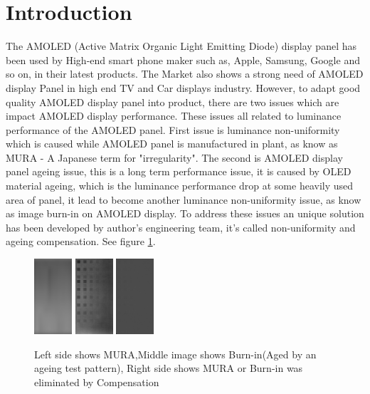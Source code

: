 \documentclass{article}
\begin{document}
\section{Introduction}
The AMOLED (Active Matrix Organic Light Emitting Diode) display panel has been used by High-end smart phone maker such as, Apple, Samsung, Google and so on, in their latest products. The Market also shows a strong need of AMOLED display Panel in high end TV and Car displays industry. However, to adapt good quality AMOLED display panel into product, there are two issues which are impact AMOLED display performance. These issues all related to luminance performance of the AMOLED panel. First issue is luminance non-uniformity which is caused while AMOLED panel is manufactured in plant, as know as MURA - A Japanese term for "irregularity". The second is AMOLED display panel ageing issue, this is a long term performance issue, it is caused by OLED material ageing, which is the luminance performance drop at some heavily used area of panel, it lead to become another luminance non-uniformity issue, as know as image burn-in on AMOLED display. 
To address these issues an unique solution has been developed by author's engineering team, it's called non-uniformity and ageing compensation. See figure \ref{fig1}. \\
\begin{figure}[h]
    \centering
    \includegraphics[width=0.125\textwidth]{images/csfed_G_480_I0_PsdLum.png}\hfill    
    \includegraphics[width=0.125\textwidth]{images/A1_G_300_I0_PsdLum.csv.png}\hfill
    \includegraphics[width=0.125\textwidth]{images/A1_G_300_I2_PsdLum.csv.png}\hfill
    \caption{Left side shows MURA,Middle image shows Burn-in(Aged by an ageing test pattern), Right side shows MURA or Burn-in was eliminated by  Compensation }
    \label{fig1}
\end{figure}
\end{document}
